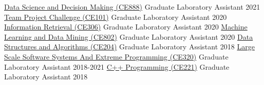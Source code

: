 



\begin{cvhonors}

\cvhonor
{\href{https://www.essex.ac.uk/modules/default.aspx?coursecode=CE888}{Data Science and Decision Making (CE888)}} %
{Graduate Laboratory Assistant} %
{} %
{2021} %
\cvhonor
{\href{https://www.essex.ac.uk/modules/default.aspx?coursecode=CE101&period=SP}{Team Project Challenge (CE101)}} %
{Graduate Laboratory Assistant} %
{} %
{2020} %
\cvhonor
{\href{https://www.essex.ac.uk/modules/default.aspx?coursecode=CE306&period=SP}{Information Retrieval (CE306)}} %
{Graduate Laboratory Assistant} %
{} %
{2020} %
\cvhonor
{\href{https://www.essex.ac.uk/modules/default.aspx?coursecode=CE802&level=7&period=AU}{Machine Learning and Data Mining (CE802)}} %
{Graduate Laboratory Assistant} %
{} %
{2020} %
\cvhonor
{\href{https://www.essex.ac.uk/modules/default.aspx?coursecode=CE204&level=5&period=SP}{Data Structures and Algorithms (CE204)}} %
{Graduate Laboratory Assistant} %
{} %
{2018} %
\cvhonor
{\href{https://www.essex.ac.uk/modules/default.aspx?coursecode=CE320&level=6&period=AU}{Large Scale Software Systems And Extreme Programming (CE320)}} %
{Graduate Laboratory Assistant} %
{} %
{2018-2021} %
\cvhonor
{\href{https://www.essex.ac.uk/modules/default.aspx?coursecode=CE221&level=5&period=AU}{C++ Programming (CE221)}} %
{Graduate Laboratory Assistant} %
{} %
{2018} %

\end{cvhonors}
